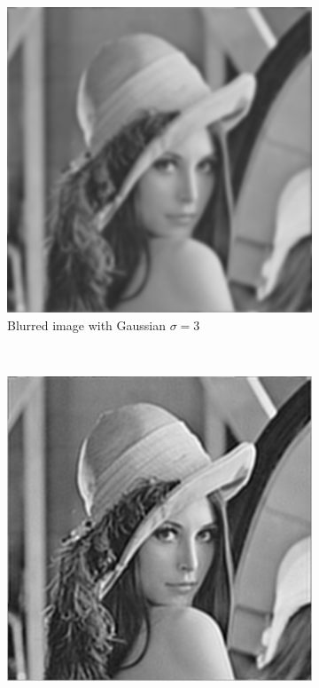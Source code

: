 \documentclass[a4paper, 10pt, conference] {article}
\begin{document}
\begin{figure}[H]
\begin{subfigure}{0.49\textwidth}
		\includegraphics[scale=0.45]{comparison/gaussian.PNG}
		\caption{Blurred image with Gaussian $\sigma = 3$}
	\end{subfigure}\\
	\begin{subfigure}{0.49\textwidth} 
		\centering						
		\includegraphics[scale=0.45]{comparison/energy1.PNG}

\end{subfigure}
\end{figure}
\end{document}
